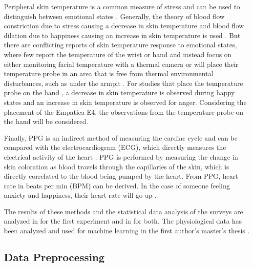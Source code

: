 \documentclass[12pt]{iopart}
\begin{document}
Peripheral skin temperature is a common measure of stress and can be used to distinguish between emotional states \cite{collet1997autonomic, salazar2015mental, karthikeyan2012descriptive}.  Generally, the theory of blood flow constriction due to stress causing a decrease in skin temperature and blood flow dilation due to happiness causing an increase in skin temperature is used \cite{karthikeyan2012descriptive}.  But there are conflicting reports of skin temperature response to emotional states, where few report the temperature of the wrist or hand and instead focus on either monitoring facial temperature with a thermal camera \cite{salazar2015mental} or will place their temperature probe in an area that is free from thermal environmental disturbances, such as under the armpit \cite{karthikeyan2012descriptive}.  For studies that place the temperature probe on the hand \cite{collet1997autonomic}, a decrease in skin temperature is observed during happy states and an increase in skin temperature is observed for anger.  Considering the placement of the Empatica E4, the observations from the temperature probe on the hand will be considered.

Finally, PPG is an indirect method of measuring the cardiac cycle and can be compared with the electrocardiogram (ECG), which directly measures the electrical activity of the heart \cite{van2019heartpy}.  PPG is performed by measuring the change in skin coloration as blood travels through the capillaries of the skin, which is directly correlated to the blood being pumped by the heart.  From PPG, heart rate in beats per min (BPM) can be derived.  In the case of someone feeling anxiety and happiness, their heart rate will go up \cite{kreibig2010autonomic}.  

The results of these methods and the statistical data analysis of the surveys are analyzed in \cite{thayer2022effects} for the first experiment and in \cite{Stevens2020EffectsOH} for both.  The physiological data has been analyzed and used for machine learning in the first author's master's thesis \cite{arce2023unobtrusive}.  

\subsection*{Data Preprocessing}
\end{document}
